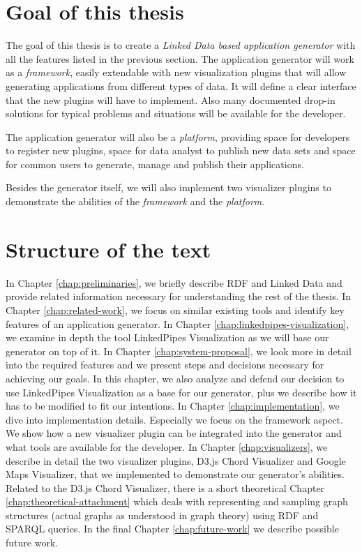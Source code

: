 \section*{Goal of this thesis}

The goal of this thesis is to create a \emph{Linked Data based application generator} with all the features listed in the previous section. The application generator will work as a \textit{framework}, easily extendable with new visualization plugins that will allow generating applications from different types of data. It will define a clear interface that the new plugins will have to implement. Also many documented drop-in solutions for typical problems and situations will be available for the developer.

The application generator will also be a \textit{platform}, providing space for developers to register new plugins, space for data analyst to publish new data sets and space for common users to generate, manage and publish their applications.

Besides the generator itself, we will also implement two visualizer plugins to demonstrate the abilities of the \textit{framework} and the \textit{platform}.

\section*{Structure of the text}

In Chapter \ref{chap:preliminaries}, we briefly describe RDF and Linked Data and provide related information necessary for understanding the rest of the thesis. In Chapter \ref{chap:related-work}, we focus on similar existing tools and identify key features of an application generator. In Chapter \ref{chap:linkedpipes-visualization}, we examine in depth the tool LinkedPipes Visualization as we will base our generator on top of it.  In Chapter \ref{chap:system-proposal}, we look more in detail into the required features and we present steps and decisions necessary for achieving our goals. In this chapter, we also analyze and defend our decision to use LinkedPipes Visualization as a base for our generator, plus we describe how it has to be modified to fit our intentions. In Chapter \ref{chap:implementation}, we dive into implementation details. Especially we focus on the framework aspect. We show how a new visualizer plugin can be integrated into the generator and what tools are available for the developer. In Chapter \ref{chap:visualizers}, we describe in detail the two visualizer plugins, D3.js Chord Visualizer and Google Maps Visualizer, that we implemented to demonstrate our generator's abilities. Related to the D3.js Chord Visualizer, there is a short theoretical Chapter \ref{chap:theoretical-attachment} which deals with representing and sampling graph structures (actual graphs as understood in graph theory) using RDF and SPARQL queries. In the final Chapter \ref{chap:future-work} we describe possible future work.